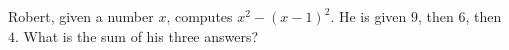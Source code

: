 Robert, given a number $x$, computes $x^2-(x-1)^2$. He is given $9$, then $6$, then $4$. What is the sum of his three answers?
